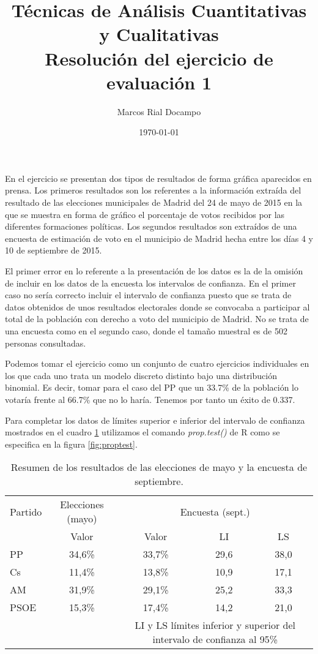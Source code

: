 \documentclass[11pt,a4paper]{article}
\author{Marcos Rial Docampo}
\title{Técnicas de Análisis Cuantitativas y Cualitativas\\Resolución del ejercicio de evaluación 1}
\date{\small{\today}}
\begin{document}
\maketitle

En el ejercicio se presentan dos tipos de resultados de forma gráfica aparecidos en prensa. Los primeros resultados son los referentes a la información extraída del resultado de las elecciones municipales de Madrid del 24 de mayo de 2015 en la que se muestra en forma de gráfico el porcentaje de votos recibidos por las diferentes formaciones políticas. Los segundos resultados son extraídos de una encuesta de estimación de voto en el municipio de Madrid hecha entre los días 4 y 10 de septiembre de 2015.

El primer error en lo referente a la presentación de los datos es la de la omisión de incluir en los datos de la encuesta los intervalos de confianza. En el primer caso no sería correcto incluir el intervalo de confianza puesto que se trata de datos obtenidos de unos resultados electorales donde se convocaba a participar al total de la población con derecho a voto del municipio de Madrid. No se trata de una encuesta como en el segundo caso, donde el tamaño muestral es de 502 personas consultadas.

Podemos tomar el ejercicio como un conjunto de cuatro ejercicios individuales en los que cada uno trata un modelo discreto distinto bajo una distribución binomial. Es decir, tomar para el caso del PP que un 33.7\% de la población lo votaría frente al 66.7\% que no lo haría. Tenemos por tanto un éxito de 0.337.

Para completar los datos de límites superior e inferior del intervalo de confianza mostrados en el cuadro \ref{tab:resumen} utilizamos el comando \textit{prop.test()} de R como se especifica en la figura \ref{fig:proptest}.

\begin{table}
	\centering
	\begin{tabular}{lcccc}
	\toprule[0.4mm]
	Partido & Elecciones (mayo) & \multicolumn{3}{c}{Encuesta (sept.)}\\
	& Valor & Valor & LI & LS \\
	\midrule
	PP & 34,6\% & 33,7\% & 29,6 & 38,0 \\
	Cs & 11,4\% & 13,8\% & 10,9 & 17,1 \\
	AM & 31,9\% & 29,1\% & 25,2 & 33,3 \\
	PSOE & 15,3\% & 17,4\% & 14,2 & 21,0 \\
	\bottomrule[0.4mm]
	& & \multicolumn{3}{p{3.4cm}}{\footnotesize{LI y LS límites inferior y superior del intervalo de confianza al 95\%}}
	\end{tabular}
	\caption{Resumen de los resultados de las elecciones de mayo y la encuesta de septiembre.}
\label{tab:resumen}
\end{table}
\end{document}

